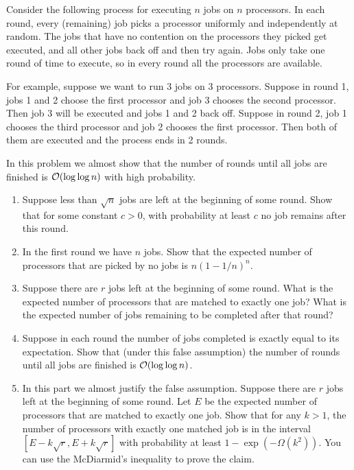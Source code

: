 \documentclass[10pt]{article}
\begin{document}
\begin{problem}[Problem 2]
    Consider the following process for executing \( n \) jobs on \( n \) processors. In each round, every (remaining)
job picks a processor uniformly and independently at random. The jobs that have no contention on the
processors they picked get executed, and all other jobs back off and then try again. Jobs only take one
round of time to execute, so in every round all the processors are available.

For example, suppose we want to run 3 jobs on 3 processors. Suppose in round 1, jobs 1 and 2 choose
the first processor and job 3 chooses the second processor. Then job 3 will be executed and jobs 1 and
2 back off. Suppose in round 2, job 1 chooses the third processor and job 2 chooses the first processor.
Then both of them are executed and the process ends in 2 rounds.

    In this problem we almost show that the number of rounds until all jobs are finished is \( \mathcal{O}(\log \log n) \) with
high probability.

\begin{enumerate}[nolistsep,label=(\alph*)]
    \item Suppose less than \( \sqrt{n} \) jobs are left at the beginning of some round. Show that for some constant \( c > 0 \), with probability at least \( c  \) no job remains after this round.
    \item In the first round we have \( n \) jobs. Show that the expected number of processors that are picked by no jobs is \( n(1 - 1/n)^n \).
    \item Suppose there are \( r \) jobs left at the beginning of some round. What is the expected number of processors that are matched to exactly one job? What is the expected number of jobs remaining to be completed after that round?
    \item Suppose in each round the number of jobs completed is exactly equal to its expectation. Show that (under this false assumption) the number of rounds until all jobs are finished is \( \mathcal{O}(\log \log n) \).
    \item In this part we almost justify the false assumption. Suppose there are \( r \) jobs left at the beginning of some round. Let \( E \) be the expected number of processors that are matched to exactly one job. Show that for any \( k > 1 \), the number of processors with exactly one matched job is in the interval \( [E-k\sqrt{r},E+k\sqrt{r}] \) with probability at least \( 1-\exp(-\Omega(k^2)) \). You can use the McDiarmid’s inequality to prove the claim.


\end{enumerate}
\end{problem}
\end{document}
